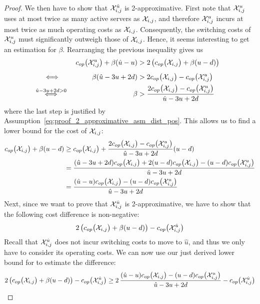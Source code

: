\begin{proof}
We then have to show that $\mathcal{X}_{i,j}^{\hat{u}}$ is 2-approximative.
First note that $\mathcal{X}_{i,j}^u$ uses at most twice as many active servers as $\mathcal{X}_{i,j}$, and therefore $\mathcal{X}_{i,j}^u$ incurs at most twice as much operating costs as $\mathcal{X}_{i,j}$. Consequently, the switching costs of $\mathcal{X}_{i,j}^u$ must significantly outweigh those of $\mathcal{X}_{i,j}$. Hence, it seems interesting to get an estimation for $\beta$. Rearranging the previous inequality gives us
\begin{align*}
	&&\opcosts\bigl(\mx_{i,j}^u\bigr)+\beta(\hat{u}-u)&>2\left(\opcosts\bigl(\mx_{i,j}\bigr)+\beta(u-d)\right)&\\
	&\stackrel{\phantom{\hat{u}-3u+2d)>0}}{\iff}&\beta(\hat{u}-3u+2d)&>2\opcosts\bigl(\mx_{i,j}\bigr)-\opcosts\bigl(\mx_{i,j}^u\bigr)&\\
	&\stackrel{\hat{u}-3u+2d>0}{\iff}&\beta&>\frac{2\opcosts\bigl(\mx_{i,j}\bigr)-\opcosts\bigl(\mx_{i,j}^u\bigr)}{\hat{u}-3u+2d}
\end{align*}
where the last step is justified by Assumption~\eqref{eq:proof_2_approximative_asm_dist_pos}.
This allows us to find a lower bound for the cost of $\mathcal{X}_{i,j}$:
\begin{align*}
	c_{op}\bigl(\mathcal{X}_{i,j}\bigr)+\beta(u-d)&\ge c_{op}\bigl(\mathcal{X}_{i,j}\bigr)+\frac{2c_{op}\bigl(\mathcal{X}_{i,j}\bigr)-c_{op}\bigl(\mathcal{X}_{i,j}^u\bigr)}{\hat{u}-3u+2d}(u-d)\\
	&=\frac{(\hat{u}-3u+2d)c_{op}\bigl(\mathcal{X}_{i,j}\bigr)+2(u-d)c_{op}\bigl(\mathcal{X}_{i,j}\bigr)-(u-d)c_{op}\bigl(\mathcal{X}_{i,j}^u\bigr)}{\hat{u}-3u+2d}\\
	&=\frac{(\hat{u}-u)c_{op}\bigl(\mathcal{X}_{i,j}\bigr)-(u-d)c_{op}\bigl(\mathcal{X}_{i,j}^u\bigr)}{\hat{u}-3u+2d}
\end{align*}
Next, since we want to prove that $\mathcal{X}_{i,j}^{\hat{u}}$ is 2-approximative, we have to show that the following cost difference is non-negative:
\begin{align*}
	2\left(c_{op}\bigl(\mathcal{X}_{i,j}\bigr)+\beta(u-d)\right)-c_{op}\bigl(\mathcal{X}_{i,j}^{\hat{u}}\bigr)
\end{align*}
Recall that $\mathcal{X}_{i,j}^{\hat{u}}$ does not incur switching costs to move to $\hat{u}$, and thus we only have to consider its operating costs.
We can now use our just derived lower bound for  to estimate the difference:
\begin{align*}
	2\left(\opcosts\bigl(\mx_{i,j}\bigr)+\beta(u-d)\right)-\opcosts\bigl(\mx_{i,j}^{\hat{u}}\bigr)\ge2\,\frac{(\hat{u}-u)\opcosts\bigl(\mx_{i,j}\bigr)-(u-d)\opcosts\bigl(\mx_{i,j}^u\bigr)}{\hat{u}-3u+2d}-\opcosts\bigl(\mx_{i,j}^{\hat{u}}\bigr)

\end{align*}
\end{proof}
